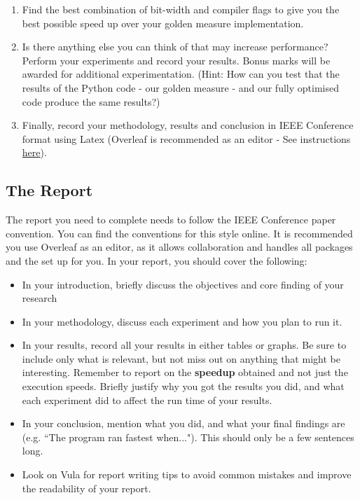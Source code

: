 \begin{enumerate}
    \item Find the best combination of bit-width and compiler flags to give you the best possible speed up over your golden measure implementation. 
    \item Is there anything else you can think of that may increase performance? Perform your experiments and record your results. Bonus marks will be awarded for additional experimentation. (Hint: How can you test that the results of the Python code - our golden measure - and our fully optimised code produce the same results?)
    \item Finally, record your methodology, results and conclusion in IEEE Conference format using Latex (Overleaf is recommended as an editor - See instructions \href{http://wiki.ee.uct.ac.za/LaTeX}{here}).
\end{enumerate}

\subsection{The Report}
The report you need to complete needs to follow the IEEE Conference paper convention. You can find the conventions for this style online. It is recommended you use Overleaf as an editor, as it allows collaboration and handles all packages and the set up for you. In your report, you should cover the following:
\begin{itemize}
    \item In your introduction, briefly discuss the objectives and core finding of your research
    \item In your methodology, discuss each experiment and how you plan to run it.
    \item In your results, record all your results in either tables or graphs. Be sure to include only what is relevant, but not miss out on anything that might be interesting. Remember to report on the \textbf{speedup} obtained and not just the execution speeds. Briefly justify why you got the results you did, and what each experiment did to affect the run time of your results.
    \item In your conclusion, mention what you did, and what your final findings are (e.g. ``The program ran fastest when..."). This should only be a few sentences long.
    \item Look on Vula for report writing tips to avoid common mistakes and improve the readability of your report.
\end{itemize}

